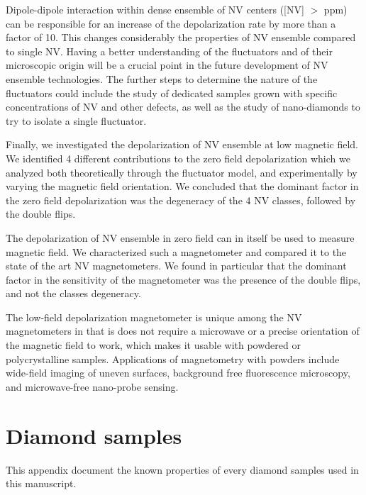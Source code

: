 \documentclass[a4paper, 11pt]{report}
\begin{document}
Dipole-dipole interaction within dense ensemble of NV centers ([NV] $>$ ppm) can be responsible for an increase of the depolarization rate by more than a factor of 10. This changes considerably the properties of NV ensemble compared to single NV. Having a better understanding of the fluctuators and of their microscopic origin will be a crucial point in the future development of NV ensemble technologies. The further steps to determine the nature of the fluctuators could include the study of dedicated samples grown with specific concentrations of NV and other defects, as well as the study of nano-diamonds to try to isolate a single fluctuator.

Finally, we investigated the depolarization of NV ensemble at low magnetic field. We identified 4 different contributions to the zero field depolarization which we analyzed both theoretically through the fluctuator model, and experimentally by varying the magnetic field orientation. We concluded that the dominant factor in the zero field depolarization was the degeneracy of the 4 NV classes, followed by the double flips. 

The depolarization of NV ensemble in zero field can in itself be used to measure magnetic field. We characterized such a magnetometer and compared it to the state of the art NV magnetometers. We found in particular that the dominant factor in the sensitivity of the magnetometer was the presence of the double flips, and not the classes degeneracy. 

The low-field depolarization magnetometer is unique among the NV magnetometers in that is does not require a microwave or a precise orientation of the magnetic field to work, which makes it usable with powdered or polycrystalline samples. Applications of magnetometry with powders include wide-field imaging of uneven surfaces, background free fluorescence microscopy, and microwave-free nano-probe sensing.


\appendix
 
\chapter{Diamond samples}
\label{Appendix samples}
This appendix document the known properties of every diamond samples used in this manuscript.
\end{document}
